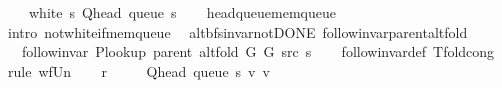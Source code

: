 \begin{isabellebody}
\ \ \ {\isachardoublequoteopen}{\isasymnot}\ white\ s\ {\isacharparenleft}{\kern0pt}Q{\isacharunderscore}{\kern0pt}head\ {\isacharparenleft}{\kern0pt}queue\ s{\isacharparenright}{\kern0pt}{\isacharparenright}{\kern0pt}{\isachardoublequoteclose}\isanewline
%
\isadelimproof
\ \ %
\endisadelimproof
%
\isatagproof
{}\isamarkupfalse%
\ head{\isacharunderscore}{\kern0pt}queue{\isacharunderscore}{\kern0pt}mem{\isacharunderscore}{\kern0pt}queue\isanewline
\ \ \isamarkupfalse%
\ {\isacharparenleft}{\kern0pt}intro\ not{\isacharunderscore}{\kern0pt}white{\isacharunderscore}{\kern0pt}if{\isacharunderscore}{\kern0pt}mem{\isacharunderscore}{\kern0pt}queue{\isacharparenright}{\kern0pt}%
\endisatagproof
{\isafoldproof}%
%
\isadelimproof
%
\endisadelimproof
%
\isadelimdocument
%
\endisadelimdocument
%
\isatagdocument
%
\isamarkupsubsubsection{%
}
\isamarkuptrue%
%
\endisatagdocument
{\isafolddocument}%
%
\isadelimdocument
%
\endisadelimdocument
{}\isamarkupfalse%
\ {\isacharparenleft}{\kern0pt}\ alt{\isacharunderscore}{\kern0pt}bfs{\isacharunderscore}{\kern0pt}invar{\isacharunderscore}{\kern0pt}not{\isacharunderscore}{\kern0pt}DONE{\isacharparenright}{\kern0pt}\ follow{\isacharunderscore}{\kern0pt}invar{\isacharunderscore}{\kern0pt}parent{\isacharunderscore}{\kern0pt}alt{\isacharunderscore}{\kern0pt}fold{\isacharcolon}{\kern0pt}\isanewline
\ \ \ {\isachardoublequoteopen}follow{\isacharunderscore}{\kern0pt}invar\ {\isacharparenleft}{\kern0pt}P{\isacharunderscore}{\kern0pt}lookup\ {\isacharparenleft}{\kern0pt}parent\ {\isacharparenleft}{\kern0pt}alt{\isacharunderscore}{\kern0pt}fold\ G{}\ G{}\ src\ s{\isacharparenright}{\kern0pt}{\isacharparenright}{\kern0pt}{\isacharparenright}{\kern0pt}{\isachardoublequoteclose}\isanewline
%
\isadelimproof
\ \ %
\endisadelimproof
%
\isatagproof
{}\isamarkupfalse%
\ follow{\isacharunderscore}{\kern0pt}invar{\isacharunderscore}{\kern0pt}def\ T{\isacharunderscore}{\kern0pt}fold{\isacharunderscore}{\kern0pt}cong\isanewline
{}\isamarkupfalse%
\ {\isacharparenleft}{\kern0pt}rule\ wf{\isacharunderscore}{\kern0pt}Un{\isacharparenright}{\kern0pt}\isanewline
\ \ \isamarkupfalse%
\ {\isacharquery}{\kern0pt}r\ {\isacharequal}{\kern0pt}\isanewline
\ \ \ \ {\isachardoublequoteopen}{\isacharbraceleft}{\kern0pt}{\isacharparenleft}{\kern0pt}Q{\isacharunderscore}{\kern0pt}head\ {\isacharparenleft}{\kern0pt}queue\ s{\isacharparenright}{\kern0pt}{\isacharcomma}{\kern0pt}\ v{\isacharparenright}{\kern0pt}\ {\isacharbar}{\kern0pt}v{\isachardot}{\kern0pt}\isanewline

\end{isabellebody}
